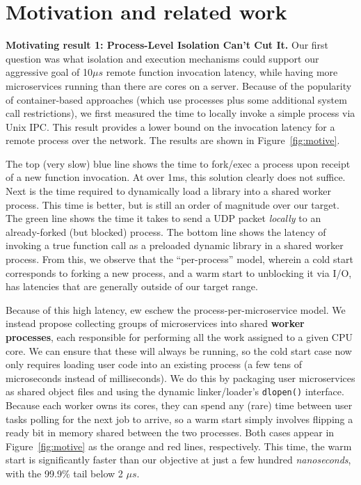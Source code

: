 \section{Motivation and related work}
\label{sec:motive}

\textbf{Motivating result 1:  Process-Level Isolation Can't Cut It.}
Our first question was what isolation and execution mechanisms could support
our aggressive goal of 10$\mu{}s$ remote function invocation latency, while
having more microservices running than there are cores on a server.
Because of the popularity of container-based approaches (which use processes
plus some additional system call restrictions), we first measured the time
to locally invoke a simple process via Unix IPC.  This result provides
a lower bound on the invocation latency for a remote process over the network.
The results are shown in Figure~\ref{fig:motive}.

The top (very slow) blue line shows the time to fork/exec a process upon receipt
of a new function invocation.  At over 1ms, this solution clearly does not
suffice.  Next is the time required to dynamically load a library into a shared
worker process.  This time is better, but is still an order of magnitude over
our target.  The green line shows the time it takes to send a UDP packet
\emph{locally} to an already-forked (but blocked) process.  The bottom
line shows the latency of invoking a true function call as a preloaded dynamic
library in a shared worker process.  From this, we observe that the
``per-process'' model, wherein a cold start corresponds to forking a new
process, and a warm start to unblocking it via I/O, has latencies that are
generally outside of our target range.

Because of this high latency, ew eschew the process-per-microservice model.
We instead propose
collecting groups of microservices into shared \textbf{worker processes},
each responsible for performing all the work assigned to a given CPU core.  We can
ensure that these will always be running, so the cold start case now only requires
loading user code into an existing process (a few tens of microseconds instead
of milliseconds).  We do this by packaging user
microservices as shared object files and using the dynamic linker/loader's
\texttt{dlopen()} interface.  Because each worker owns its cores, they can spend any
(rare) time between user tasks polling for the next job to arrive, so a warm start
simply involves flipping a ready bit in memory shared between the two processes.
Both cases appear in Figure~\ref{fig:motive} as the orange and red lines,
respectively.  This time, the warm start is significantly faster than our objective
at just a few hundred \textit{nanoseconds}, with the 99.9\% tail below 2
$\mu{}s$.

